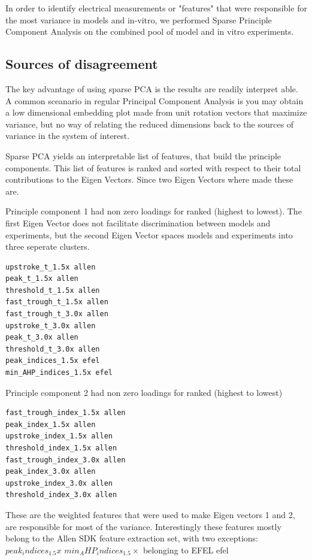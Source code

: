 In order to identify electrical measurements or "features" that were responsible for the most variance in models and in-vitro, we performed Sparse Principle Component Analysis \cite{zou2006sparse} on the combined pool of model and in vitro experiments. 



\subsection{Sources of disagreement}

The key advantage of using sparse PCA is the results are readily interpret able. A common sceanario in regular Principal Component Analysis is you may obtain a low dimensional embedding plot made from unit rotation vectors that maximize variance, but no way of relating the reduced dimensions back to the sources of variance in the system of interest. 

Sparse PCA yields an interpretable list of features, that build the principle components. This list of features is ranked and sorted with respect to their total contributions to the Eigen Vectors. Since two Eigen Vectors where made these are.

Principle component 1 had non zero loadings for ranked (highest to lowest).
The first Eigen Vector does not facilitate discrimination between models and experiments, but the second Eigen Vector spaces models and experiments into three seperate clusters.
\begin{verbatim}
upstroke_t_1.5x allen 
peak_t_1.5x allen 
threshold_t_1.5x allen 
fast_trough_t_1.5x allen 
fast_trough_t_3.0x allen 
upstroke_t_3.0x allen 
peak_t_3.0x allen 
threshold_t_3.0x allen 
peak_indices_1.5x efel 
min_AHP_indices_1.5x efel 
\end{verbatim}

Principle component 2 had non zero loadings for ranked (highest to lowest)
\begin{verbatim}
fast_trough_index_1.5x allen 
peak_index_1.5x allen 
upstroke_index_1.5x allen 
threshold_index_1.5x allen 
fast_trough_index_3.0x allen 
peak_index_3.0x allen 
upstroke_index_3.0x allen 
threshold_index_3.0x allen
\end{verbatim}

These are the weighted features that were used to make Eigen vectors 1 and 2, are responsible for most of the variance. Interestingly these features mostly belong to the Allen SDK feature extraction set, with two exceptions: $peak_indices_1.5x$ $min_AHP_indices_1.5 \times$ belonging to EFEL efel 

